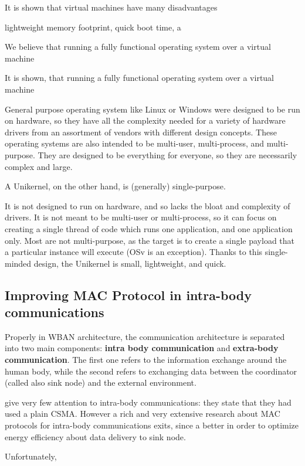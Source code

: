 \documentclass[sigchi]{acmart}
\begin{document}
It is shown that virtual machines have many disadvantages 


lightweight memory footprint, quick boot time, a



We believe that running a fully functional operating system over a virtual machine  


It is shown, that running a fully functional operating system over a virtual machine 

General purpose operating system like Linux or Windows were designed to be run on hardware, so they have all the complexity needed for a variety of hardware drivers from an assortment of vendors with different design concepts. These operating systems are also intended to be multi-user, multi-process, and multi-purpose. They are designed to be everything for everyone, so they are necessarily complex and large.

A Unikernel, on the other hand, is (generally) single-purpose. 


It is not designed to run on hardware, and so lacks the bloat and complexity of drivers. It is not meant to be multi-user or multi-process, so it can focus on creating a single thread of code which runs one application, and one application only. Most are not multi-purpose, as the target is to create a single payload that a particular instance will execute (OSv is an exception). Thanks to this single-minded design, the Unikernel is small, lightweight, and quick. 

\subsection{Improving MAC Protocol in intra-body communications}

Properly in WBAN architecture, the communication architecture is separated into two main components: \textbf{intra body communication} and \textbf{extra-body communication}. The first one refers to the information exchange around the human body, while the second refers to exchanging data between the coordinator (called also sink node) and the external environment.

\citet{MSAReport} give very few attention to intra-body communications: they state that they had used a plain CSMA. However a rich and very extensive research about MAC protocols for intra-body communications exits, since a better  in order to optimize energy efficiency about data delivery to sink node.

Unfortunately, 
\end{document}
